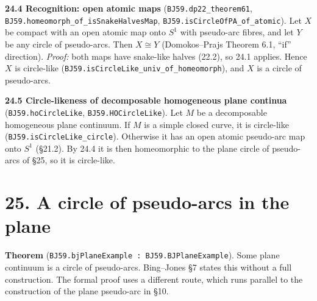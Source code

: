 \documentclass[11pt]{article}
\newcommand{\lean}[1]{\texttt{#1}}
\begin{document}
\textbf{24.4 Recognition: open atomic maps} (\lean{BJ59.\hspace{0pt}dp22\_\hspace{0pt}theorem61}, \lean{BJ59.\hspace{0pt}homeomorph\_\hspace{0pt}of\_\hspace{0pt}isSnakeHalvesMap}, \lean{BJ59.\hspace{0pt}isCircleOfPA\_\hspace{0pt}of\_\hspace{0pt}atomic}). Let $X$ be compact with an open atomic map onto $S^1$ with pseudo-arc fibres, and let $Y$ be any circle of pseudo-arcs. Then $X \cong Y$ (Domokos--Prajs Theorem 6.1, ``if'' direction). \emph{Proof:} both maps have snake-like halves (22.2), so 24.1 applies. Hence $X$ is circle-like (\lean{BJ59.\hspace{0pt}isCircleLike\_\hspace{0pt}univ\_\hspace{0pt}of\_\hspace{0pt}homeomorph}), and $X$ is a circle of pseudo-arcs.

\textbf{24.5 Circle-likeness of decomposable homogeneous plane continua} (\lean{BJ59.\hspace{0pt}hoCircleLike}, \lean{BJ59.\hspace{0pt}HOCircleLike}). Let $M$ be a decomposable homogeneous plane continuum. If $M$ is a simple closed curve, it is circle-like (\lean{BJ59.\hspace{0pt}isCircleLike\_\hspace{0pt}circle}). Otherwise it has an open atomic pseudo-arc map onto $S^1$ (\S{}21.2). By 24.4 it is then homeomorphic to the plane circle of pseudo-arcs of \S{}25, so it is circle-like.

\section*{25. A circle of pseudo-arcs in the plane}

\textbf{Theorem} (\lean{BJ59.\hspace{0pt}bjPlaneExample : BJ59.\hspace{0pt}BJPlaneExample}). Some plane continuum is a circle of pseudo-arcs. Bing--Jones \S{}7 states this without a full construction. The formal proof uses a different route, which runs parallel to the construction of the plane pseudo-arc in \S{}10.
\end{document}
